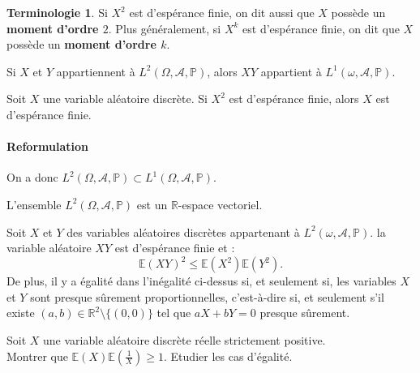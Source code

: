 \documentclass[french]{article}
\renewcommand{\P}{\mathbb{P}}
\newcommand{\R}{\mathbb{R}}
\newcommand{\E}{\mathbb{E}}
\theoremstyle{plain}
\theoremstyle{definition}
\newtheorem*{terminologie}{Terminologie}
\theoremstyle{remark}
\begin{document}
\begin{terminologie}
	Si $X^2$ est d'espérance finie, on dit aussi que $X$ possède un \textbf{moment d'ordre $2$}. Plus généralement, si $X^k$ est d'espérance finie, on dit que $X$ possède un \textbf{moment d'ordre $k$}.
\end{terminologie}

\begin{lem}%
	Si $X$ et $Y$ appartiennent à $L^2(\Omega,\mathcal{A},\P)$, alors $XY$ appartient à $L^1(\omega,\mathcal{A},\P)$.
\end{lem}

\begin{prop}%
	Soit $X$ une variable aléatoire discrète. Si $X^2$ est d'espérance finie, alors $X$ est d'espérance finie.
\end{prop}

\paragraph{Reformulation} On a donc $L^2(\Omega,\mathcal{A},\P)\subset L^1(\Omega,\mathcal{A},\P)$.

\begin{prop}%
	L'ensemble $L^2(\Omega,\mathcal{A},\P)$ est un $\R$-espace vectoriel.
\end{prop}

\begin{thm}%
	Soit $X$ et $Y$ des variables aléatoires discrètes appartenant à $L^2(\omega,\mathcal{A},\P)$. la variable aléatoire $XY$ est d'espérance finie et :
	$$\E(XY)^2\leqslant\E(X^2)\E(Y^2).$$
	De plus, il y a égalité dans l'inégalité ci-dessus si, et seulement si, les variables $X$ et $Y$ sont presque sûrement proportionnelles, c'est-à-dire si, et seulement s'il existe $(a,b)\in\R^2\setminus\{(0,0)\}$ tel que $aX+bY=0$ presque sûrement.
\end{thm}

\begin{exo}
	Soit $X$ une variable aléatoire discrète réelle strictement positive.\\
	Montrer que $\E(X)\displaystyle\E\left(\frac{1}{X}\right)\geqslant1$. Etudier les cas d'égalité.
\end{exo}
\end{document}
